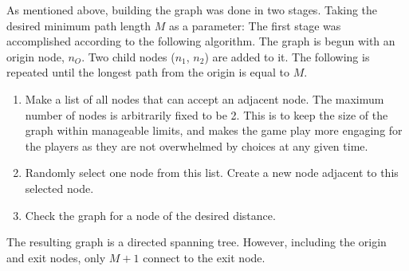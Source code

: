 \documentclass[landscape, a0, final]{a0poster}
\begin{document}
\begin{minipage}{0.50\linewidth}
\begin{minipage}[t]{0.50\linewidth}
\begin{minipage}[t]{0.9\linewidth}
As mentioned above, building the graph was done in two stages.  Taking the desired minimum path length $M$ as a parameter: 
The first stage was accomplished according to the following algorithm.  The graph is begun with an origin node, $n_O$.  Two child nodes ($n_1$, $n_2$) are added to it.  The following is repeated until the longest path from the origin is equal to $M$. 
\begin{enumerate} 
    \item Make a list of all nodes that can accept an adjacent node.  The maximum number of nodes is arbitrarily fixed to be 2.  This is to keep the size of the graph within manageable limits, and makes the game play more engaging for the players as they are not overwhelmed by choices at any given time. 
    \item Randomly select one node from this list.  Create a new node adjacent to this selected node.
    \item Check the graph for a node of the desired distance.
\end{enumerate} 
The resulting graph is a directed spanning tree.  However, including the origin and exit nodes, only $M + 1$ connect to the exit node.


\end{minipage}
\end{minipage}
\end{minipage}
\end{document}
